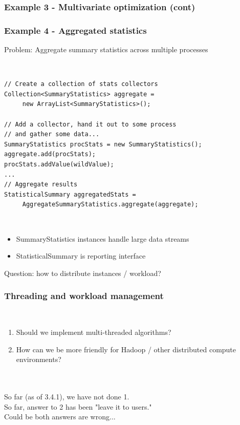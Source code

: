 \documentclass[14pt,mathserif]{beamer}
\begin{document}
\begin{frame}[fragile]
  \frametitle{Example 3 - Multivariate optimization (cont)}
  
\end{frame}
\begin{frame}[fragile]
  \frametitle{Example 4 - Aggregated statistics}

\begin{small}
Problem: Aggregate summary statistics across multiple processes
\end{small}
\\
\begin{verbatim}
// Create a collection of stats collectors
Collection<SummaryStatistics> aggregate =
     new ArrayList<SummaryStatistics>();
     
// Add a collector, hand it out to some process
// and gather some data...
SummaryStatistics procStats = new SummaryStatistics();
aggregate.add(procStats);
procStats.addValue(wildValue);
...
// Aggregate results
StatisticalSummary aggregatedStats =
     AggregateSummaryStatistics.aggregate(aggregate);

\end{verbatim}
\\
\begin{small}
\begin{itemize}
\item SummaryStatistics instances handle large data streams
\item StatisticalSummary is reporting interface
\end{itemize}
Question: how to distribute instances / workload?
\end{small}
\end{frame}

\begin{frame}
  \frametitle{Threading and workload management}

\\
\begin{enumerate}
\item Should we implement multi-threaded algorithms?
\item How can we be more friendly for Hadoop / other distributed compute environments?
\end{enumerate}
\\
\\
So far (as of 3.4.1), we have not done 1. \\
So far, answer to 2 has been "leave it to users." \\
Could be both answers are wrong...
\end{frame}
\end{document}
